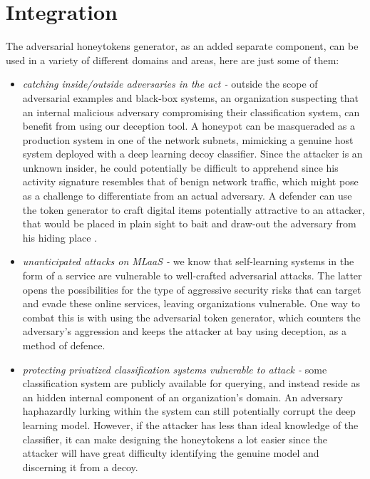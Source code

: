 \documentclass[grad,lot,lof,11pt,oneside,onehalfspace]{RUthesis}
\begin{document}
\section{Integration}
The adversarial honeytokens generator,  as an added separate component, can be used in a variety of different domains and areas, here are just some of them:
\begin{itemize}
	\item \textit{catching inside/outside adversaries in the act -} outside the scope of adversarial examples and black-box systems, an organization suspecting that an internal malicious adversary compromising their classification system, can benefit from using our deception tool. A honeypot can be masqueraded as a production system in one of the network subnets, mimicking a genuine host system deployed with a deep learning decoy classifier. Since the attacker is an unknown insider, he could potentially be difficult to apprehend since his activity signature resembles that of benign network traffic, which might pose as a challenge to differentiate from an actual adversary. A defender can use the token generator to craft digital items potentially attractive to an attacker, that would be placed in plain sight to bait and draw-out the adversary from his hiding place  . 
	\item \textit{unanticipated attacks on MLaaS -} we know that self-learning systems in the form of a service are vulnerable to well-crafted adversarial attacks. The latter opens the possibilities for the type of aggressive security risks that can target and evade these online services, leaving organizations vulnerable. One way to combat this is with using the adversarial token generator, which counters the adversary's aggression and keeps the attacker at bay using deception, as a method of defence.
	\item \textit{protecting privatized classification systems vulnerable to attack -} some classification system are publicly available for querying, and instead reside as an hidden internal component of an organization's domain. An adversary haphazardly lurking within the system can still potentially corrupt the deep learning model. However, if the attacker has less than ideal knowledge of the classifier, it can make designing the honeytokens a lot easier since the attacker will have great difficulty identifying the genuine model and discerning it from a decoy.   
	
\end{itemize}
\end{document}
